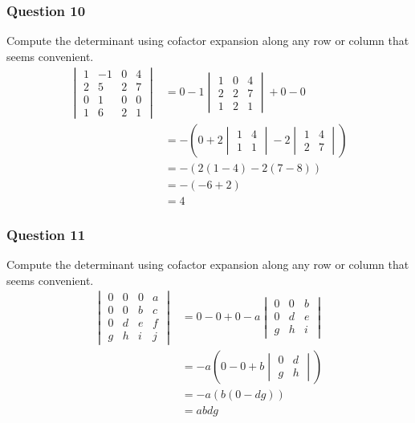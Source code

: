 \documentclass{math}
\begin{document}
\subsubsection*{Question 10}
Compute the determinant using cofactor expansion along any row or column that
seems convenient.
\begin{align*}
  \begin{vmatrix}
    1 & -1 & 0 & 4 \\
    2 & 5 & 2 & 7 \\
    0 & 1 & 0 & 0 \\
    1 & 6 & 2 & 1
  \end{vmatrix} &= 0-1\begin{vmatrix}
    1 & 0 & 4 \\
    2 & 2 & 7 \\
    1 & 2 & 1
  \end{vmatrix}+0-0 \\
  &= -\left(0+2\begin{vmatrix}
    1 & 4 \\
    1 & 1
  \end{vmatrix}-2\begin{vmatrix}
    1 & 4 \\
    2 & 7
  \end{vmatrix}\right) \\
  &= -(2(1-4)-2(7-8)) \\
  &= -(-6+2) \\
  &= 4
\end{align*}

\subsubsection*{Question 11}
Compute the determinant using cofactor expansion along any row or column that
seems convenient.
\begin{align*}
  \begin{vmatrix}
    0 & 0 & 0 & a \\
    0 & 0 & b & c \\
    0 & d & e & f \\
    g & h & i & j
  \end{vmatrix} &= 0-0+0-a\begin{vmatrix}
    0 & 0 & b \\
    0 & d & e \\
    g & h & i
  \end{vmatrix} \\
  &= -a\left(0-0+b\begin{vmatrix}
    0 & d \\
    g & h
  \end{vmatrix}\right) \\
  &= -a(b(0-dg)) \\
  &= abdg
\end{align*}
\end{document}
